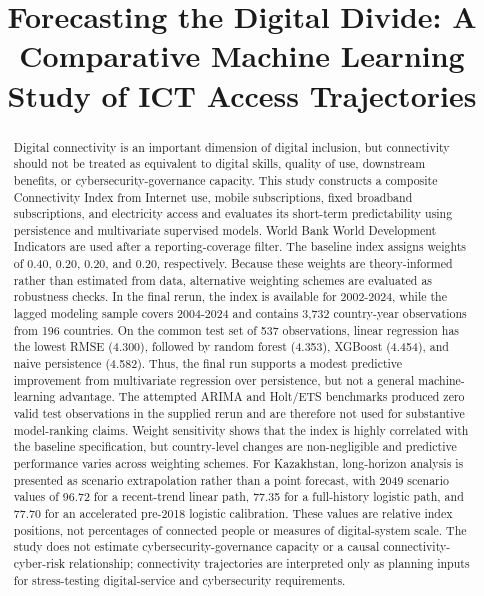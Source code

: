 \documentclass[conference]{IEEEtran}
\title{Forecasting the Digital Divide: A Comparative Machine Learning Study of ICT Access Trajectories}
\author{\IEEEauthorblockN{Liana Rakhimzhanova \& Agzam Shamsadinov}}
\begin{document}
\maketitle

\begin{abstract}
Digital connectivity is an important dimension of digital inclusion, but connectivity should not be treated as equivalent to digital skills, quality of use, downstream benefits, or cybersecurity-governance capacity. This study constructs a composite Connectivity Index from Internet use, mobile subscriptions, fixed broadband subscriptions, and electricity access and evaluates its short-term predictability using persistence and multivariate supervised models. World Bank World Development Indicators are used after a reporting-coverage filter. The baseline index assigns weights of 0.40, 0.20, 0.20, and 0.20, respectively. Because these weights are theory-informed rather than estimated from data, alternative weighting schemes are evaluated as robustness checks. In the final rerun, the index is available for 2002-2024, while the lagged modeling sample covers 2004-2024 and contains 3,732 country-year observations from 196 countries. On the common test set of 537 observations, linear regression has the lowest RMSE (4.300), followed by random forest (4.353), XGBoost (4.454), and naive persistence (4.582). Thus, the final run supports a modest predictive improvement from multivariate regression over persistence, but not a general machine-learning advantage. The attempted ARIMA and Holt/ETS benchmarks produced zero valid test observations in the supplied rerun and are therefore not used for substantive model-ranking claims. Weight sensitivity shows that the index is highly correlated with the baseline specification, but country-level changes are non-negligible and predictive performance varies across weighting schemes. For Kazakhstan, long-horizon analysis is presented as scenario extrapolation rather than a point forecast, with 2049 scenario values of 96.72 for a recent-trend linear path, 77.35 for a full-history logistic path, and 77.70 for an accelerated pre-2018 logistic calibration. These values are relative index positions, not percentages of connected people or measures of digital-system scale. The study does not estimate cybersecurity-governance capacity or a causal connectivity-cyber-risk relationship; connectivity trajectories are interpreted only as planning inputs for stress-testing digital-service and cybersecurity requirements.
\end{abstract}
\end{document}
